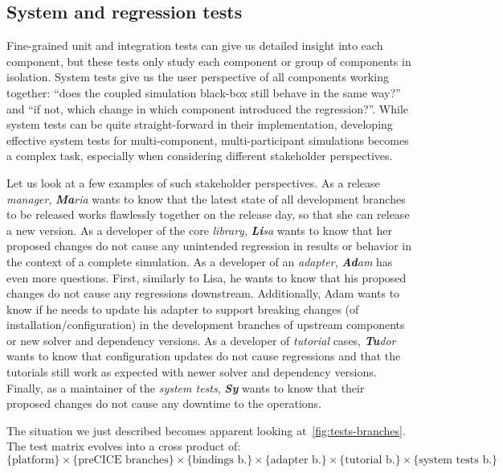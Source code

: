 \subsection{System and regression tests}
\label{ssec:system_tests} 

Fine-grained unit and integration tests can give us detailed insight into each component, but these tests only study each component or group of components in isolation.
System tests give us the user perspective of all components working together: ``does the coupled simulation black-box still behave in the same way?'' and ``if not, which change in which component introduced the regression?''.
While system tests can be quite straight-forward in their implementation, developing effective system tests for multi-component, multi-participant
simulations becomes a complex task, especially when considering different stakeholder perspectives.

Let us look at a few examples of such stakeholder perspectives. As a release \textit{manager}, \textit{\textbf{Ma}ria} wants to know that the latest state of all development branches to be released works flawlessly together on the release day, so that she can release a new version.
As a developer of the core \textit{library}, \textit{\textbf{Li}sa} wants to know that her proposed changes do not cause any unintended regression in results or behavior in the context of a complete simulation.
As a developer of an \textit{adapter}, \textit{\textbf{Ad}am} has even more questions. First, similarly to Lisa, he wants to know that his proposed changes do not cause any regressions downstream. Additionally, Adam wants to know if he needs to update his adapter to support breaking changes (of installation/configuration) in the development branches of upstream components or new solver and dependency versions.
As a developer of \textit{tutorial} cases, \textit{\textbf{Tu}dor} wants to know that configuration updates do not cause regressions and that the tutorials still work as expected with newer solver and dependency versions.
Finally, as a maintainer of the \textit{system tests}, \textit{\textbf{Sy}} wants to know that their proposed changes do not cause any downtime to the operations.

The situation we just described becomes apparent looking at~\autoref{fig:tests-branches}.
The test matrix evolves into a cross product of:
\begin{equation*}
  \{\text{platform}\} \times \{\text{preCICE branches}\} \times \{\text{bindings b.}\} \times \{\text{adapter b.}\} \times \{\text{tutorial b.}\} \times \{\text{system tests b.}\}
\end{equation*}

